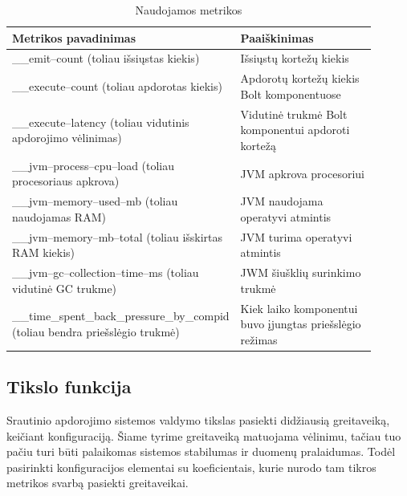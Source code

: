\documentclass{VUMIFPSbakalaurinis}
\begin{document}
\begin{longtable}{|p{0.5\linewidth}|p{0.4\linewidth}|}
    \caption{Naudojamos metrikos}
    \label{metrics–table}\\
    \hline
    \rowcolor[HTML]{C0C0C0} 
    Metrikos pavadinimas                                  & Paaiškinimas            \\ \hline
    \endfirsthead
    \endhead
    \_\_emit–count (toliau išsiųstas kiekis)                           & Išsiųstų kortežų kiekis                    \\ \hline
    \_\_execute–count  (toliau apdorotas kiekis)                       & Apdorotų kortežų kiekis Bolt komponentuose \\ \hline
    \_\_execute–latency  (toliau vidutinis apdorojimo vėlinimas)       & Vidutinė trukmė Bolt komponentui apdoroti kortežą                                          \\ \hline
    \_\_jvm–process–cpu–load  (toliau procesoriaus apkrova)            & JVM apkrova procesoriui     \\ \hline
    \_\_jvm–memory–used–mb    (toliau naudojamas RAM)                  & JVM naudojama operatyvi atmintis       \\ \hline
    \_\_jvm–memory–mb–total     (toliau išskirtas RAM kiekis)          & JVM turima operatyvi atmintis    \\ \hline
    \_\_jvm–gc–collection–time–ms  (toliau vidutinė GC trukme)         & JWM šiušklių surinkimo trukmė     \\ \hline
    \_\_time\_spent\_back\_pressure\_by\_compid  (toliau bendra priešslėgio trukmė)  & Kiek laiko komponentui buvo įjungtas priešslėgio režimas  \\ \hline
\end{longtable}

\subsection{Tikslo funkcija}

Srautinio apdorojimo sistemos valdymo tikslas pasiekti didžiausią greitaveiką, keičiant konfiguraciją. Šiame tyrime greitaveiką matuojama vėlinimu, tačiau tuo pačiu turi būti palaikomas sistemos stabilumas ir duomenų pralaidumas. Todėl pasirinkti konfiguracijos elementai su koeficientais, kurie nurodo tam tikros metrikos svarbą pasiekti greitaveikai. 
\end{document}
